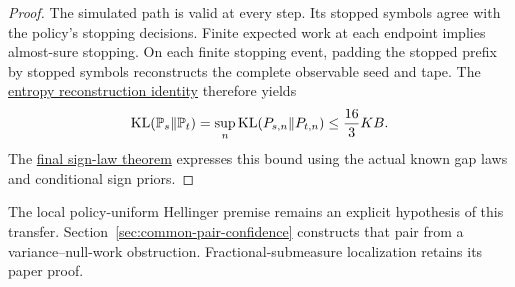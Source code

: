 \begin{proof}
The simulated path is valid at every step. Its stopped symbols agree
with the policy's stopping decisions. Finite expected work at each
endpoint implies almost-sure stopping. On each finite stopping
event, padding the stopped prefix by stopped symbols reconstructs the
complete observable seed and tape. The
\href{https://github.com/davidiach/adaptive-threshold-estimation/blob/1f6a773aa1176a35cd83930d4d37b7251439c03e/lean/ThresholdHC/TypedConfidence/StoppedTransfer.lean}{entropy reconstruction identity}
therefore yields
\[
 \operatorname{KL}(\mathbb P_s\Vert\mathbb P_t)
 =\sup_n\operatorname{KL}(P_{s,n}\Vert P_{t,n})
 \le\frac{16}{3}KB.
\]
The
\href{https://github.com/davidiach/adaptive-threshold-estimation/blob/1f6a773aa1176a35cd83930d4d37b7251439c03e/lean/ThresholdHC/TypedConfidence/SignTransfer.lean}{final sign-law theorem}
expresses this bound using the actual known gap laws and conditional
sign priors.
\end{proof}

The local policy-uniform Hellinger premise remains an explicit
hypothesis of this transfer. Section~\ref{sec:common-pair-confidence}
constructs that pair from a variance--null-work obstruction.
Fractional-submeasure localization retains its paper proof.
